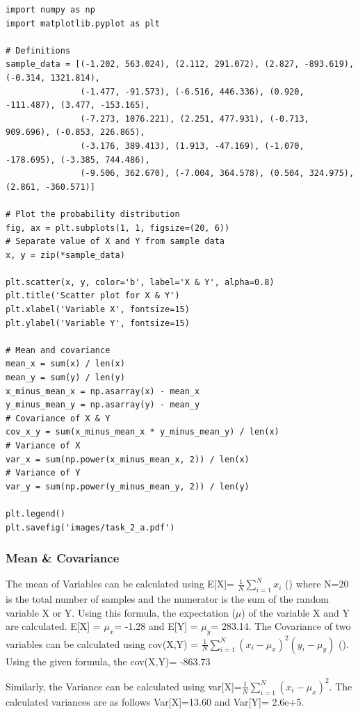 \begin{lstlisting}[caption={Plotting the Scatter Plot with Variance Calculations)},label={lst:code_task_2_a}]
import numpy as np
import matplotlib.pyplot as plt

# Definitions
sample_data = [(-1.202, 563.024), (2.112, 291.072), (2.827, -893.619), (-0.314, 1321.814),
               (-1.477, -91.573), (-6.516, 446.336), (0.920, -111.487), (3.477, -153.165),
               (-7.273, 1076.221), (2.251, 477.931), (-0.713, 909.696), (-0.853, 226.865),
               (-3.176, 389.413), (1.913, -47.169), (-1.070, -178.695), (-3.385, 744.486),
               (-9.506, 362.670), (-7.004, 364.578), (0.504, 324.975), (2.861, -360.571)]

# Plot the probability distribution
fig, ax = plt.subplots(1, 1, figsize=(20, 6))
# Separate value of X and Y from sample data
x, y = zip(*sample_data)

plt.scatter(x, y, color='b', label='X & Y', alpha=0.8)
plt.title('Scatter plot for X & Y')
plt.xlabel('Variable X', fontsize=15)
plt.ylabel('Variable Y', fontsize=15)

# Mean and covariance
mean_x = sum(x) / len(x)
mean_y = sum(y) / len(y)
x_minus_mean_x = np.asarray(x) - mean_x
y_minus_mean_y = np.asarray(y) - mean_y
# Covariance of X & Y
cov_x_y = sum(x_minus_mean_x * y_minus_mean_y) / len(x)
# Variance of X
var_x = sum(np.power(x_minus_mean_x, 2)) / len(x)
# Variance of Y
var_y = sum(np.power(y_minus_mean_y, 2)) / len(y)

plt.legend()
plt.savefig('images/task_2_a.pdf')
\end{lstlisting}

\subsubsection{Mean \& Covariance}   

The mean of Variables can be calculated using E[X]=  $\frac{1}{N} \sum_{i=1}^{N}x_i$  (\cite{Iubh:2021}) where N=20 is the total number of samples and the numerator is the sum of the random variable X or Y. Using this formula, the expectation ($\mu$) of the variable X and Y are calculated. E[X] = $\mu_x$= -1.28 and E[Y] = $\mu_y$= 283.14.\newline 
The Covariance of two variables can be calculated using cov(X,Y) =  $\frac{1}{N} \sum_{i=1}^{N}(x_i - \mu_x)^2 (y_i - \mu_y)$ (\cite{Iubh:2021}). Using the given formula, the cov(X,Y)= -863.73

Similarly, the Variance can be calculated using var[X]=$\frac{1}{N} \sum_{i=1}^{N}(x_i - \mu_x)^2$. The calculated variances are as follows Var[X]=13.60 and Var[Y]= 2.6e+5.

